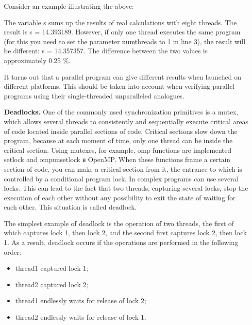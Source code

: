 {	\par Consider an example illustrating the above:
	\begin{figure}[H]
		
	\end{figure}
	\par The variable s sums up the results of real calculations with eight threads. The result is s = 14.393189. However, if only one thread executes the same program (for this you need to set the parameter num\textunderscore threads to 1 in line 3), the result will be different: s = 14.357357. The difference between the two values is approximately 0.25 \%.
	\par It turns out that a parallel program can give different results when launched on different platforms. This should be taken into account when verifying parallel programs using their single-threaded unparalleled analogues.
	\par\textbf{Deadlocks.} One of the commonly used synchronization primitives is a mutex, which allows several threads to consistently and sequentially execute critical areas of code located inside parallel sections of code. Critical sections slow down the program, because at each moment of time, only one thread can be inside the critical section. Using mutexes, for example, omp functions are implemented \textunderscore set\textunderscore lock and omp\textunderscore unset\textunderscore lock в OpenMP. When these functions frame a certain section of code, you can make a critical section from it, the entrance to which is controlled by a conditional program lock. In complex programs can use several locks. This can lead to the fact that two threads, capturing several locks, stop the execution of each other without any possibility to exit the state of waiting for each other. This situation is called deadlock.
	\par The simplest example of deadlock is the operation of two threads, the first of which captures lock 1, then lock 2, and the second first captures lock 2, then lock 1. As a result, deadlock occurs if the operations are performed in the following order:
	\begin{itemize}
\item thread1 captured lock 1;
\item thread2 captured lock 2;
\item thread1 endlessly waits for release of lock 2;
\item thread2 endlessly waits for release of lock 1.
	\end{itemize}
}
